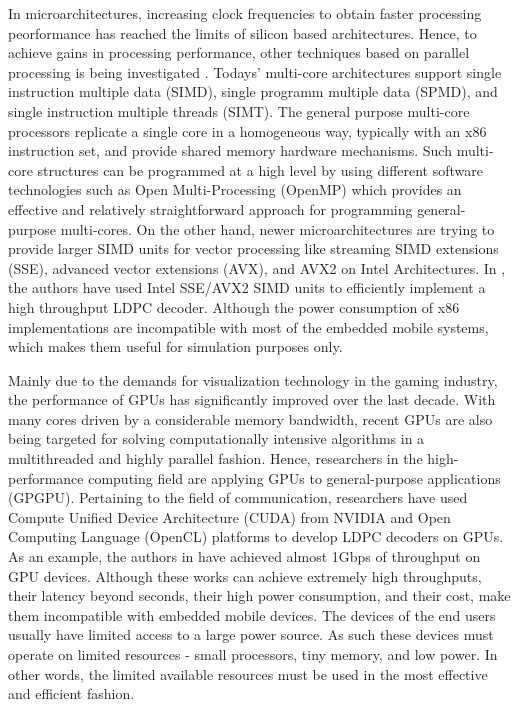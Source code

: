 \documentclass[conference]{IEEEtran}
\begin{document}
In microarchitectures, increasing clock frequencies to obtain faster processing peorformance has reached the limits of silicon based architectures. Hence, to achieve gains in processing performance, other techniques based on parallel processing is being investigated \cite{art_ldpc_cpu1}. Todays' multi-core architectures support single instruction multiple data (SIMD), single programm multiple data (SPMD), and single instruction multiple threads (SIMT). The general purpose multi-core processors replicate a single core in a homogeneous way, typically with an x86 instruction set, and provide shared memory hardware mechanisms\cite{art_massively}. Such multi-core structures can be programmed at a high level by using different software technologies \cite{art_multicore_techs} such as Open Multi-Processing (OpenMP) \cite{art_openMp_book} which provides an effective and relatively straightforward approach for programming general-purpose multi-cores. On the other hand, newer microarchitectures are trying to provide larger SIMD units for vector processing like streaming SIMD extensions (SSE), advanced vector extensions (AVX), and AVX2 \cite{art_intel_sse} on Intel Architectures. In \cite{art_ldpc_cpu1}, the authors have used Intel SSE/AVX2 SIMD units to efficiently implement a high throughput LDPC decoder. Although the power consumption of x86 implementations are incompatible with most of the embedded mobile systems, which makes them useful for simulation purposes only.

Mainly due to the demands for visualization technology in the gaming industry, the performance of GPUs has significantly improved over the last decade. With many cores driven by a considerable memory bandwidth, recent GPUs are also being targeted for solving computationally intensive algorithms in a multithreaded and highly parallel fashion. Hence, researchers in the high-performance computing field are applying GPUs to general-purpose applications (GPGPU). Pertaining to the field of communication, researchers have used Compute Unified Device Architecture (CUDA) from NVIDIA \cite{art_gpu_0,art_cuda_openmp, art_memory_coalesced, art_optimize_0, art_layered1} and Open Computing Language (OpenCL) \cite{art_ldpc_OpenCl} platforms to develop LDPC decoders on GPUs. As an example, the authors in \cite{art_gpu_0} have achieved almost 1Gbps of throughput on GPU devices. Although these works can achieve extremely high throughputs, their latency beyond seconds, their high power consumption, and their cost, make them incompatible with embedded mobile devices. The devices of the end users usually have limited access to a large power source. As such these devices must operate on limited resources - small processors, tiny memory, and low power. In other words, the limited available resources must be used in the most effective and efficient fashion.
\end{document}
